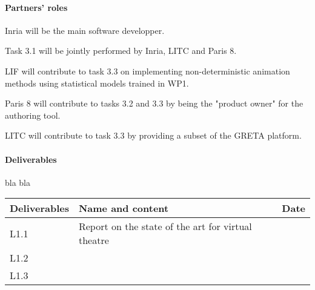 \paragraph{Partners' roles}

Inria will be the main software developper.

Task 3.1 will be jointly performed by Inria, LITC and Paris 8.

LIF will contribute to task 3.3 on implementing non-deterministic animation 
methods using statistical models trained in WP1.

Paris 8 will contribute to tasks 3.2 and 3.3 by being the "product owner" for the authoring tool.

LITC will contribute to task   3.3 by providing a subset of the GRETA platform.





\paragraph{Deliverables}

bla bla

\begin{tabular}{|l|l|l|}\hline
Deliverables & Name and content  & Date  \\\hline
L1.1  & Report on the state of the art for virtual theatre & \\\hline
L1.2  &  & \\\hline
L1.3  &  & \\\hline
\end{tabular}


\endinput

